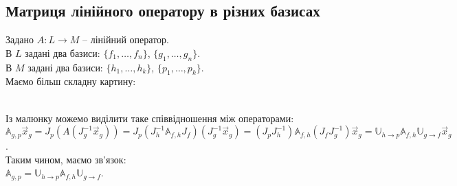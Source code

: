 \documentclass[a4paper, 10pt]{article}
\theoremstyle{theoremdd}
\newtheorem{remark}[theorem]{Remark}
\begin{document}
\iffalse
\begin{remark}
Знаходження матриці дужа схожа з випадком із пункту 2.7. Якщо тут встановити одиничний оператор $A: L_f \to L_g$, в якому для першого старий базис, а в другому відповідно новий, то отримаємо наш поточний випадок.
\end{remark}
\fi

\subsection{Матриця лінійного оператору в різних базисах}
Задано $A \colon L \to M$ -- лінійний оператор.\\
В $L$ задані два базиси: $\{f_1,\dots, f_n\}$, $\{g_1, \dots, g_n\}$.\\
В $M$ задані два базиси: $\{h_1,\dots, h_k\}$, $\{p_1, \dots, p_k\}$.\\
Маємо більш складну картину:\\
\\
Із малюнку можемо виділити таке співвідношення між операторами:\\
$\mathbb{A}_{g,p} \vec{x}_g = J_p(A(J_g^{-1} \vec{x}_g)) = J_p(J_h^{-1} \mathbb{A}_{f,h} J_f)(J_g^{-1} \vec{x}_g) = (J_p J_h^{-1}) \mathbb{A}_{f,h} (J_f J_g^{-1})\vec{x}_g = \mathbb{U}_{h \to p} \mathbb{A}_{f,h} \mathbb{U}_{g \to f} \vec{x}_g$.\\
Таким чином, маємо зв'язок:\\
$\mathbb{A}_{g,p} = \mathbb{U}_{h \to p} \mathbb{A}_{f,h} \mathbb{U}_{g \to f}$.
\end{document}
